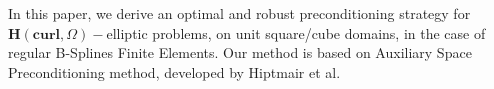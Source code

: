In this paper, we derive an optimal and robust preconditioning strategy for $\bm{H}(\textbf{curl},\Omega)-$elliptic problems, on unit square/cube domains, in the case of regular B-Splines Finite Elements. Our method is based on Auxiliary Space Preconditioning method, developed by Hiptmair et al. 
